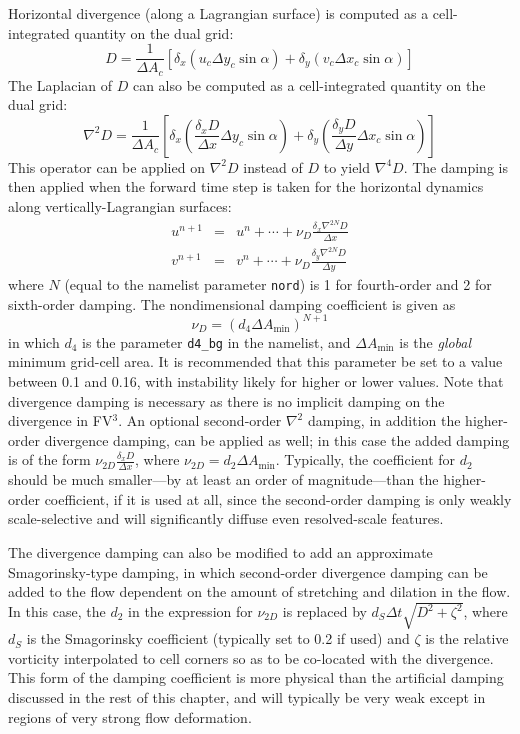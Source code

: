 \documentclass[12pt,letterpaper]{book}
\newcommand{\fv}{FV$^{\mathrm{3}}$}
\begin{document}
Horizontal divergence (along a Lagrangian surface) is computed as a cell-integrated quantity on the dual grid:
\begin{equation}
D = \frac{1}{\Delta A_c} \left [ \delta_x \left ( u_c \Delta y_c \sin \alpha \right ) +  \delta_y \left (v_c \Delta x_c \sin \alpha \right )  \right ]
\end{equation}
The Laplacian of $D$ can also be computed as a cell-integrated quantity on the dual grid:
\begin{equation}
\nabla^2 D= \frac{1}{\Delta A_c} \left [ \delta_x \left ( \frac{\delta_x D}{\Delta x}  \Delta y_c \sin \alpha \right ) +  \delta_y \left (\frac{\delta_y D}{\Delta y} \Delta x_c \sin \alpha \right )  \right ]
\end{equation}
This operator can be applied on $\nabla^2 D$ instead of $D$ to yield $\nabla^4 D$. The damping is then applied when the forward time step is taken for the horizontal dynamics along vertically-Lagrangian surfaces:
\begin{eqnarray}
u^{n+1} &=& u^n + \cdots + \nu_D \frac{\delta_x \nabla^{2N} D}{\Delta x} \\
v^{n+1} &=& v^n + \cdots + \nu_D \frac{\delta_y \nabla^{2N} D}{\Delta y}
\end{eqnarray}
where $N$ (equal to the namelist parameter \texttt{nord}) is 1 for fourth-order and 2 for sixth-order damping. The nondimensional damping coefficient is given as
\begin{equation}
\nu_D = \left (d_4  \Delta A_{\min} \right)^{N+1} 
\end{equation}
in which $d_4$ is the parameter \texttt{d4\_bg} in the namelist, and $\Delta A_{\min}$ is the \textit{global} minimum grid-cell area. It is recommended that this parameter be set to a value between 0.1 and 0.16, with instability likely for higher or lower values. Note that divergence damping is necessary as there is no implicit damping on the divergence in \fv. An optional second-order $\nabla^2$ damping, in addition the higher-order divergence damping, can be applied as well; in this case the added damping is of the form $\nu_{2D} \frac{\delta_x D}{\Delta x}$, where $\nu_{2D} = d_2  \Delta A_{\min}$. Typically, the coefficient for $d_2$ should be much smaller---by at least an order of magnitude---than the higher-order coefficient, if it is used at all, since the second-order damping is only weakly scale-selective and will significantly diffuse even resolved-scale features.

The divergence damping can also be modified to add an approximate Smagorinsky-type damping, in which second-order divergence damping can be added to the flow dependent on the amount of stretching and dilation in the flow. In this case, the $d_2$ in the expression for $\nu_{2D}$ is replaced by $d_S \Delta t \sqrt{D^2 + \zeta^2}$, where $d_S$ is the Smagorinsky coefficient (typically set to 0.2 if used) and $\zeta$ is the relative vorticity interpolated to cell corners so as to be co-located with the divergence. This form of the damping coefficient is more physical than the artificial damping discussed in the rest of this chapter, and will typically be very weak except in regions of very strong flow deformation.
\end{document}
